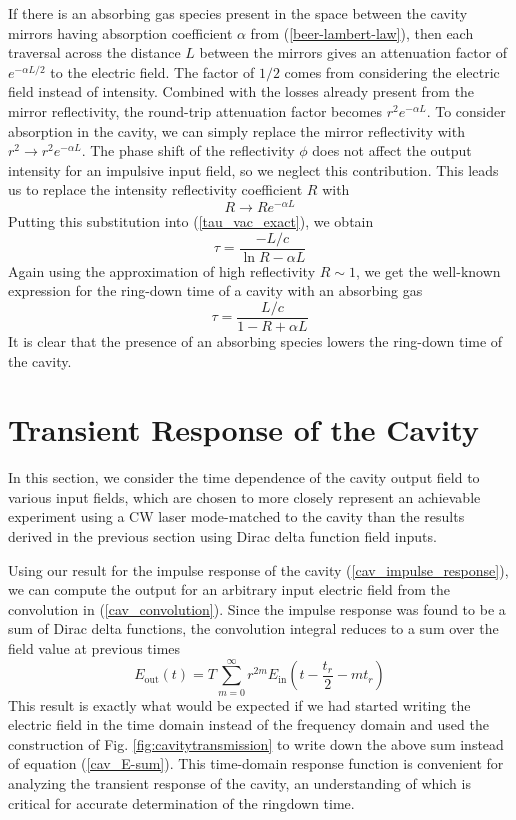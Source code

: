 If there is an absorbing gas species present in the space between the cavity mirrors having absorption coefficient $\alpha$ from (\ref{beer-lambert-law}), then each traversal across the distance $L$ between the mirrors gives an attenuation factor of $e^{-\alpha L/2}$ to the electric field. The factor of $1/2$ comes from considering the electric field instead of intensity. Combined with the losses already present from the mirror reflectivity, the round-trip attenuation factor becomes $r^2 e^{-\alpha L}$. To consider absorption in the cavity, we can simply replace the mirror reflectivity with $r^2 \rightarrow r^2 e^{-\alpha L}$. The phase shift of the reflectivity $\phi$ does not affect the output intensity for an impulsive input field, so we neglect this contribution. This leads us to replace the intensity reflectivity coefficient $R$ with
\begin{equation}
	R\rightarrow Re^{-\alpha L}
\end{equation}
Putting this substitution into (\ref{tau_vac_exact}), we obtain
\begin{equation}\label{tau_exact}
	\tau = \frac{-L/c}{\ln R - \alpha L}
\end{equation}
Again using the approximation of high reflectivity $R\sim 1$, we get the well-known expression for the ring-down time of a cavity with an absorbing gas
\begin{equation}\label{tau}
	\tau = \frac{L/c}{1-R + \alpha L}
\end{equation}
It is clear that the presence of an absorbing species lowers the ring-down time of the cavity.

\section{Transient Response of the Cavity} \label{sec:cav_td_response}
In this section, we consider the time dependence of the cavity output field to various input fields, which are chosen to more closely represent an achievable experiment using a CW laser mode-matched to the cavity than the results derived in the previous section using Dirac delta function field inputs.

Using our result for the impulse response of the cavity (\ref{cav_impulse_response}), we can compute the output for an arbitrary input electric field from the convolution in (\ref{cav_convolution}). Since the impulse response was found to be a sum of Dirac delta functions, the convolution integral reduces to a sum over the field value at previous times
\begin{equation} \label{cav_output_field}
	E_\mathrm{out}(t) = T \sum_{m=0}^{\infty} r^{2m} E_\mathrm{in} \left(t - \frac{t_r}{2} - m t_r\right)
\end{equation}
This result is exactly what would be expected if we had started writing the electric field in the time domain instead of the frequency domain and used the construction of Fig. \ref{fig:cavitytransmission} to write down the above sum instead of equation (\ref{cav_E-sum}). This time-domain response function is convenient for analyzing the transient response of the cavity, an understanding of which is critical for accurate determination of the ringdown time.

